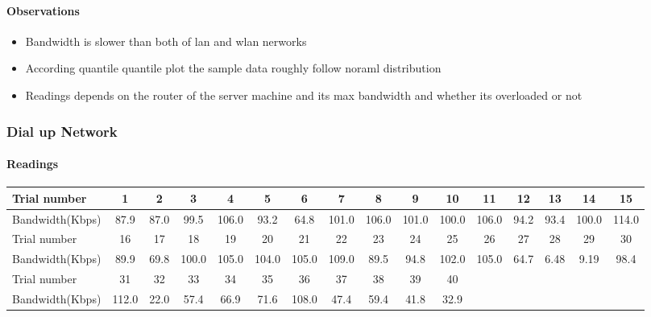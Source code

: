 \documentclass[aps,letterpaper,10pt]{revtex4}
\begin{document}
            \paragraph{Observations}
                \begin{itemize}
                        \item Bandwidth is slower than both of lan and wlan nerworks
                        \item According quantile quantile plot the sample data roughly follow noraml distribution
                        \item Readings depends on the router of the server machine and its max bandwidth and whether its overloaded or not
                \end{itemize}
        \newpage
        \subsubsection{Dial up Network}
            \paragraph{Readings}
                \begin{center}
                    \begin{tabular}{ ||l || c | c | c | c | c | c | c | c | c | c | c | c | c | c | c | }
                    \hline
                    Trial number & 1 & 2 & 3 & 4 & 5 & 6 & 7 & 8 & 9 & 10 & 11 & 12 & 13 & 14 & 15 \\ \hline
                    Bandwidth(Kbps) & 87.9 & 87.0 & 99.5 & 106.0 & 93.2 & 64.8 & 101.0 & 106.0 & 101.0 & 100.0 & 106.0 & 94.2 & 93.4 & 100.0 & 114.0  
                    \\ \hline   
                    \hline
                    Trial number & 16 & 17 & 18 & 19 & 20 & 21 & 22 & 23 & 24 & 25 & 26 & 27 & 28 & 29 & 30 \\ \hline 
                    Bandwidth(Kbps) &  89.9 & 69.8 & 100.0 & 105.0 & 104.0 & 105.0 & 109.0 & 89.5 & 94.8 & 102.0 & 105.0 & 64.7 & 6.48 & 9.19 & 98.4  
                    \\ \hline    
                    \hline
                    Trial number & 31 & 32 & 33 & 34 & 35 & 36 & 37 & 38 & 39 & 40 & & & & & \\ \hline
                    Bandwidth(Kbps) & 112.0 & 22.0 & 57.4 & 66.9 & 71.6 & 108.0 & 47.4 & 59.4 & 41.8 & 32.9 & & & & &\\
                    \hline
                    \end{tabular}
                \end{center}
                \vspace{3mm}
\end{document}

